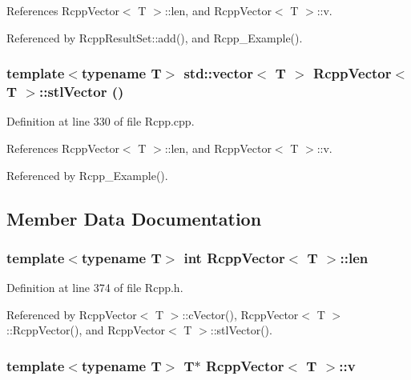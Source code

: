 References RcppVector$<$ T $>$::len, and RcppVector$<$ T $>$::v.

Referenced by RcppResultSet::add(), and Rcpp\_\-Example().\hypertarget{classRcppVector_c650f89b966962b167f3bc42aecf213b}{
\subsubsection[stlVector]{\setlength{\rightskip}{0pt plus 5cm}template$<$typename T$>$ std::vector$<$ T $>$ {\bf RcppVector}$<$ T $>$::stlVector ()}}
\label{classRcppVector_c650f89b966962b167f3bc42aecf213b}




Definition at line 330 of file Rcpp.cpp.

References RcppVector$<$ T $>$::len, and RcppVector$<$ T $>$::v.

Referenced by Rcpp\_\-Example().

\subsection{Member Data Documentation}
\hypertarget{classRcppVector_733f5ed23ade0723338904f9f08457d6}{
\subsubsection[len]{\setlength{\rightskip}{0pt plus 5cm}template$<$typename T$>$ int {\bf RcppVector}$<$ T $>$::{\bf len}}}
\label{classRcppVector_733f5ed23ade0723338904f9f08457d6}




Definition at line 374 of file Rcpp.h.

Referenced by RcppVector$<$ T $>$::cVector(), RcppVector$<$ T $>$::RcppVector(), and RcppVector$<$ T $>$::stlVector().\hypertarget{classRcppVector_c810c53db4c1b978bada104b38484b26}{
\subsubsection[v]{\setlength{\rightskip}{0pt plus 5cm}template$<$typename T$>$ T$\ast$ {\bf RcppVector}$<$ T $>$::{\bf v}}}
\label{classRcppVector_c810c53db4c1b978bada104b38484b26}




